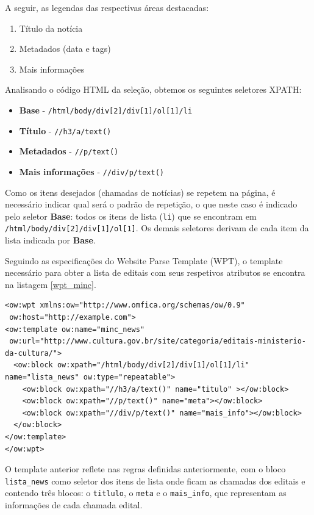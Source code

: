 A seguir, as legendas das respectivas áreas destacadas:

\begin{enumerate}
	\item Título da notícia
	\item Metadados (data e tags)
	\item Mais informações
\end{enumerate}

Analisando o código HTML da seleção, obtemos os seguintes seletores XPATH:

\begin{itemize}
	\item \textbf{Base} - \texttt{/html/body/div[2]/div[1]/ol[1]/li}
	\item \textbf{Título} - \texttt{//h3/a/text()}
	\item \textbf{Metadados} - \texttt{//p/text()}
	\item \textbf{Mais informações} - \texttt{//div/p/text()}
\end{itemize}

Como os itens desejados (chamadas de notícias) se repetem na página, é necessário indicar qual será o padrão de repetição, o que neste caso é indicado pelo seletor \textbf{Base}: todos os itens de lista (\texttt{li}) que se encontram em \texttt{/html/body/div[2]/div[1]/ol[1]}. Os demais seletores derivam de cada item da lista indicada por \textbf{Base}.

Seguindo as especificações do Website Parse Template (WPT), o template necessário para obter a lista de editais com seus respetivos atributos se encontra na listagem \ref{wpt_minc}.

\begin{lstlisting}[label=wpt_minc]
<ow:wpt xmlns:ow="http://www.omfica.org/schemas/ow/0.9"
 ow:host="http://example.com">
<ow:template ow:name="minc_news" 
 ow:url="http://www.cultura.gov.br/site/categoria/editais-ministerio-da-cultura/">
  <ow:block ow:xpath="/html/body/div[2]/div[1]/ol[1]/li" name="lista_news" ow:type="repeatable">
    <ow:block ow:xpath="//h3/a/text()" name="titulo" ></ow:block>
    <ow:block ow:xpath="//p/text()" name="meta"></ow:block>
    <ow:block ow:xpath="//div/p/text()" name="mais_info"></ow:block>
  </ow:block>
</ow:template> 
</ow:wpt>
\end{lstlisting}

O template anterior reflete nas regras definidas anteriormente, com o bloco \texttt{lista\_news} como seletor dos itens de lista onde ficam as chamadas dos editais e contendo três blocos: o \texttt{titlulo}, o \texttt{meta} e o \texttt{mais\_info}, que representam as informações de cada chamada edital.

